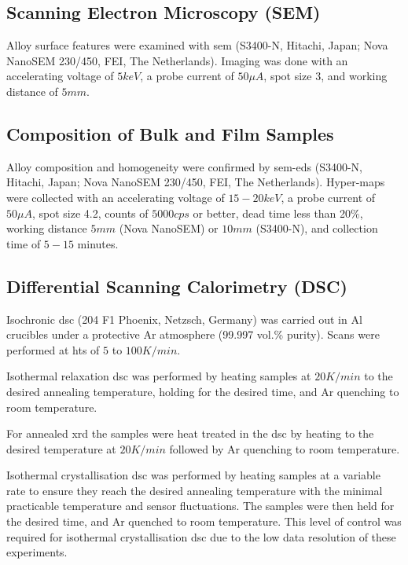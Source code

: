 \subsection{Scanning Electron Microscopy (SEM)}
Alloy surface features were examined with \gls{sem} (S3400-N, Hitachi, Japan; Nova NanoSEM 230/450, FEI, The Netherlands). Imaging was done with an accelerating voltage of $5keV$, a probe current of $50 \mu A$, spot size 3, and working distance of $5mm$.

\subsection{Composition of Bulk and Film Samples}
Alloy composition and homogeneity were confirmed by \acrshort{sem}-\acrshort{eds} (S3400-N, Hitachi, Japan; Nova NanoSEM 230/450, FEI, The Netherlands). Hyper-maps were collected with an accelerating voltage of $15-20keV$, a probe current of $50 \mu A$, spot size 4.2, counts of $5000cps$ or better, dead time less than 20\%, working distance $5mm$ (Nova NanoSEM) or $10mm$ (S3400-N), and collection time of $5-15$ minutes.

\subsection{Differential Scanning Calorimetry (DSC)}
Isochronic \gls{dsc} (204 F1 Phoenix, Netzsch, Germany) was carried out in Al crucibles under a protective Ar atmosphere (99.997 vol.\% purity). Scans were performed at \glspl{ht} of $5$ to $100 K/min$. 

Isothermal relaxation \acrshort{dsc} was performed by heating samples at $20 K/min$ to the desired annealing temperature, holding for the desired time, and Ar quenching to room temperature.

For annealed \acrshort{xrd} the samples were heat treated in the \acrshort{dsc} by heating to the desired temperature at $20 K/min$ followed by Ar quenching to room temperature.

Isothermal crystallisation \acrshort{dsc} was performed by heating samples at a variable rate to ensure they reach the desired annealing temperature with the minimal practicable temperature and sensor fluctuations. The samples were then held for the desired time, and Ar quenched to room temperature. This level of control was required for isothermal crystallisation \acrshort{dsc} due to the low data resolution of these experiments. 

